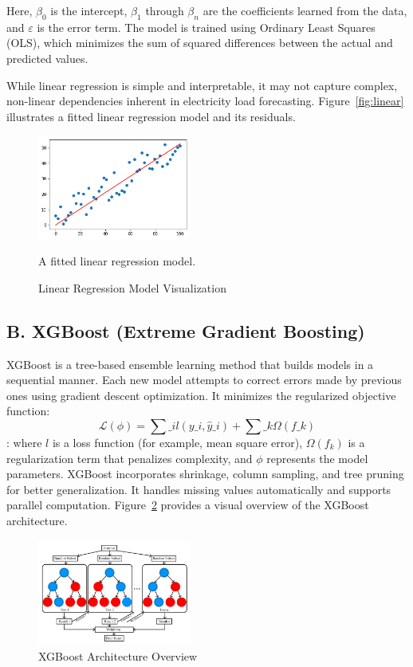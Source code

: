 \documentclass{ifacconf}
\begin{document}
Here, $\beta_0$ is the intercept, $\beta_1$ through $\beta_n$ are the coefficients learned from the data, and $\varepsilon$ is the error term. The model is trained using Ordinary Least Squares (OLS), which minimizes the sum of squared differences between the actual and predicted values. 

While linear regression is simple and interpretable, it may not capture complex, non-linear dependencies inherent in electricity load forecasting. Figure~\ref{fig:linear} illustrates a fitted linear regression model and its residuals.

\begin{figure}[h]
\centering
\includegraphics[width=0.45\textwidth]{linearregression.png}
\caption{A fitted linear regression model.}
\label{fig:linear}
\caption{Linear Regression Model Visualization}
\label{fig\:linearregression.png}
\end{figure}

\subsection{B. XGBoost (Extreme Gradient Boosting)}
XGBoost is a tree-based ensemble learning method that builds models in a sequential manner. Each new model attempts to correct errors made by previous ones using gradient descent optimization. It minimizes the regularized objective function\cite{chen2016xgboost}:
\begin{equation}
\mathcal{L}(\phi) = \sum\_{i} l(y\_i, \hat{y}\_i) + \sum\_k \Omega(f\_k)
\end{equation}
\cite{chen2016xgboost}:
where $l$ is a loss function (for example, mean square error), $\Omega(f_k)$ is a regularization term that penalizes complexity, and $\phi$ represents the model parameters. XGBoost incorporates shrinkage, column sampling, and tree pruning for better generalization. It handles missing values automatically and supports parallel computation. Figure~\ref{fig:xgboost} provides a visual overview of the XGBoost architecture.

\begin{figure}[h]
  \centering
  \includegraphics[width=0.45\textwidth]{xgboost.png}
  \caption{XGBoost Architecture Overview \cite{Oztornaci2025}}
  \label{fig:xgboost}
\end{figure}
\end{document}
